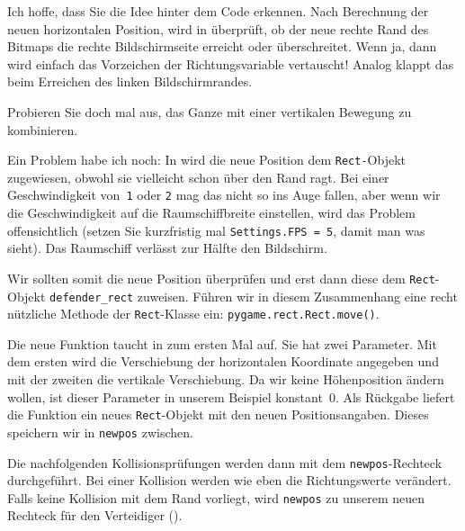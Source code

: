 
Ich hoffe, dass Sie die Idee hinter dem Code erkennen. Nach Berechnung der neuen horizontalen Position, wird in  überprüft, ob der neue rechte Rand des Bitmaps die rechte Bildschirmseite erreicht oder überschreitet. Wenn ja, dann wird einfach das Vorzeichen der Richtungsvariable vertauscht! Analog klappt das beim Erreichen des linken Bildschirmrandes. 

Probieren Sie doch mal aus, das Ganze mit einer vertikalen Bewegung zu kombinieren.

Ein Problem habe ich noch: In  wird die neue Position dem \texttt{Rect-}Objekt zugewiesen, obwohl sie vielleicht schon über den Rand ragt. Bei einer Geschwindigkeit von~\texttt{1} oder \texttt{2} mag das nicht so ins Auge fallen, aber wenn wir die Geschwindigkeit auf die Raumschiffbreite einstellen, wird das Problem offensichtlich (setzen Sie kurzfristig mal \texttt{Settings.FPS = 5}, damit man was sieht). Das Raumschiff verlässt zur Hälfte den Bildschirm. 

Wir sollten somit die neue Position überprüfen und erst dann diese dem \texttt{Rect}-Objekt \texttt{defender\_rect} zuweisen. Führen wir in diesem Zusammenhang eine recht nützliche Methode der \texttt{Rect}-Klasse ein: \texttt{pygame.rect.Rect.move()}.


Die neue Funktion taucht in  zum ersten Mal auf. Sie hat zwei Parameter. Mit dem ersten wird die Verschiebung der horizontalen Koordinate angegeben und mit der zweiten die vertikale Verschiebung. Da wir keine Höhenposition ändern wollen, ist dieser Parameter in unserem Beispiel konstant~0. Als Rückgabe liefert die Funktion ein neues \texttt{Rect}-Objekt mit den neuen Positionsangaben. Dieses speichern wir in \texttt{newpos} zwischen.

Die nachfolgenden Kollisionsprüfungen werden dann mit dem \texttt{newpos}-Rechteck durchgeführt. Bei einer Kollision werden wie eben die Richtungswerte verändert. Falls keine Kollision mit dem Rand vorliegt, wird \texttt{newpos} zu unserem neuen Rechteck für den Verteidiger ().

